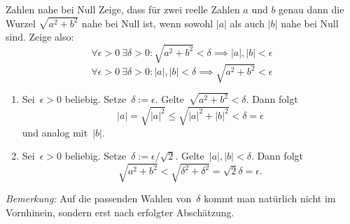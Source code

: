 \documentclass{algblatt}
\begin{document}
\begin{aufgabe}{Zahlen nahe bei Null}
Zeige, dass für zwei reelle Zahlen $a$ und $b$ genau dann die Wurzel
$\sqrt{a^2 + b^2}$ nahe bei Null ist, wenn sowohl $|a|$ als auch $|b|$
nahe bei Null sind. Zeige also:
\[    \forall \epsilon > 0\ \exists \delta > 0  \colon 
        \sqrt{a^2 + b^2} < \delta  \implies |a|, |b| < \epsilon
\]
\[
    \forall \epsilon > 0\ \exists \delta > 0  \colon 
        |a|, |b| < \delta  \implies \sqrt{a^2 + b^2} < \epsilon
\]
\vspace{-1.5em}
\begin{loesung}
\begin{enumerate}
\item Sei~$\epsilon > 0$ beliebig. Setze~$\delta := \epsilon$. Gelte~$\sqrt{a^2
+ b^2} < \delta$. Dann folgt
\[ |a| = \sqrt{|a|^2} \leq \sqrt{|a|^2 + |b|^2} < \delta = \epsilon \]
und analog mit~$|b|$.
\item Sei~$\epsilon > 0$ beliebig. Setze~$\delta := \epsilon/\sqrt{2}$.
Gelte~$|a|,|b| < \delta$. Dann folgt
\[ \sqrt{a^2 + b^2} < \sqrt{\delta^2 + \delta^2} = \sqrt{2} \delta = \epsilon.
\]
\end{enumerate}
\emph{Bemerkung:} Auf die passenden Wahlen von~$\delta$ kommt man natürlich
nicht im Vornhinein, sondern erst nach erfolgter Abschätzung.
\end{loesung}
\end{aufgabe}
\end{document}
